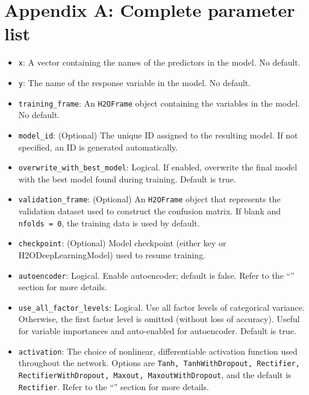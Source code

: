 \section{Appendix A: Complete parameter list}
\begin{itemize}

\item \texttt{x}: A vector containing the names of the predictors in the model. No default.

\item \texttt{y}: The name of the response variable in the model. No default.

\item \texttt{training\_frame}: An \texttt{H2OFrame} object containing the variables in the model.  No default.

\item \texttt{model\_id}: (Optional) The unique ID assigned to the resulting model. If not specified, an ID is generated automatically. 

\item \texttt{overwrite\_with\_best\_model}: Logical. If enabled, overwrite the final model with the best model found during training. Default is true.

\item \texttt{validation\_frame}: (Optional) An \texttt{H2OFrame} object that represents the validation dataset used to construct the confusion matrix. If blank and \texttt{nfolds = 0}, the training data is used by default. 

\item \texttt{checkpoint}: (Optional) Model checkpoint (either key or H2ODeepLearningModel) used to resume training. 

\item \texttt{autoencoder}: Logical. Enable autoencoder; default is false. Refer to the ``'' section for more details.

\item \texttt{use\_all\_factor\_levels}: Logical. Use all factor levels of categorical variance. Otherwise, the first factor level is omitted (without loss of accuracy). Useful for variable importances and auto-enabled for autoencoder.  Default is true.

\item \texttt{activation}: The choice of nonlinear, differentiable activation function used throughout the network. Options are \texttt{Tanh, TanhWithDropout, Rectifier, RectifierWithDropout, Maxout, MaxoutWithDropout}, and the default is \texttt{Rectifier}. Refer to the ``'' section for more details.


\end{itemize}
